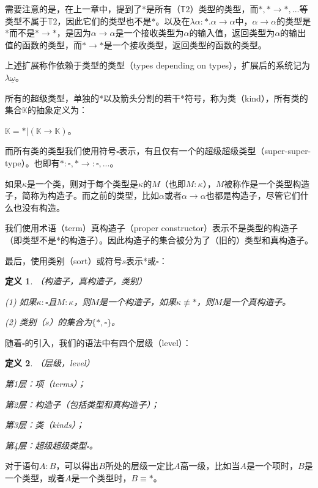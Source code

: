 \documentclass[UTF8]{article}
\newtheorem{thm}{定义}[section]
\begin{document}
		需要注意的是，在上一章中，提到了*是所有（$\mathbb{T}2$）类型的类型，而$*,*\rightarrow*,...$等类型不属于$\mathbb{T}2$，因此它们的类型也不是*。以及在$\lambda\alpha:*.\alpha\rightarrow\alpha$中，$\alpha\rightarrow\alpha$的类型是*而不是$*\rightarrow*$，是因为$\alpha\rightarrow\alpha$是一个接收类型为$\alpha$的输入值，返回类型为$\alpha$的输出值的函数的类型，而$*\rightarrow*$是一个接收类型，返回类型的函数的类型。
		
		上述扩展称作依赖于类型的类型（types depending on types），扩展后的系统记为$\lambda{\underline{\omega}}$。
			
		所有的超级类型，单独的*以及箭头分割的若干*符号，称为类（kind），所有类的集合$\mathbb{K}$的抽象定义为：
		
		$\mathbb{K}=*|(\mathbb{K}\rightarrow\mathbb{K})$。
		
		而所有类的类型我们使用符号$\square$表示，有且仅有一个的超级超级类型（super-super-type）。也即有$*:\square,*\rightarrow:\square,...$。
		
		如果$\kappa$是一个类，则对于每个类型是$\kappa$的$M$（也即$M:\kappa$），$M$被称作是一个类型构造子，简称为构造子。而之前的类型，比如$\alpha$或者$\alpha\rightarrow\alpha$也都是构造子，尽管它们什么也没有构造。
		
		我们使用术语（term）真构造子（proper constructor）表示不是类型的构造子（即类型不是*的构造子）。因此构造子的集合被分为了（旧的）类型和真构造子。
		
		最后，使用类别（sort）或符号$s$表示*或$\square$：
		
		\begin{thm}（构造子，真构造子，类别）
			
			(1) 如果$\kappa:\square$且$M:\kappa$，则$M$是一个构造子，如果$\kappa\not\equiv*$，则$M$是一个真构造子。
			
			(2) 类别（$s$）的集合为$\{*,\square\}$。
		\end{thm}
	
		随着$\square$的引入，我们的语法中有四个层级（level）：
		
		\begin{thm}（层级，level）
			
			第1层：项（terms）；
			
			第2层：构造子（包括类型和真构造子）；
			
			第3层：类（kinds）；
			
			第4层：超级超级类型$\square$。
		\end{thm}
	
		对于语句$A:B$，可以得出$B$所处的层级一定比$A$高一级，比如当$A$是一个项时，$B$是一个类型，或者$A$是一个类型时，$B\equiv*$。
		
\end{document}
